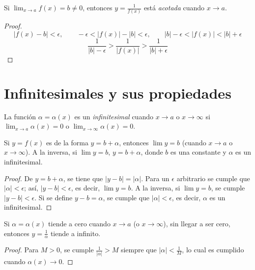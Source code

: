 \begin{theorem} \label{sec:acotado:teo:1}
  Si $\lim_{x \to a} f(x) = b \ne 0$, entonces $y = \frac{1}{f(x)}$ está \emph{acotada} cuando $x \to a$.
\end{theorem}

\begin{proof}
  $$|f(x) - b| < \epsilon, \qquad -\epsilon < |f(x)| - |b| < \epsilon,
  \qquad |b| -\epsilon < |f(x)| < |b| + \epsilon$$
  $$\frac{1}{|b| -\epsilon} > \frac{1}{|f(x)|} > \frac{1}{|b| + \epsilon}$$
\end{proof}




\section{Infinitesimales y sus propiedades}

\begin{definition}
  La función $\alpha = \alpha(x)$ es un \emph{infinitesimal} cuando $x \to a$ o $x \to \infty$ si $\lim_{x \to a} \alpha(x) = 0$ o $\lim_{x \to \infty} \alpha(x) = 0$.
\end{definition}


\begin{theorem} \label{sec:inf:teo:suminf}
  Si $y = f(x)$ es de la forma $y = b + \alpha$, entonces $\lim y = b$ (cuando $x \to a$ o $x \to \infty$). A la inversa, si $\lim y = b$, $y = b + \alpha$, donde $b$ es una constante y $\alpha$ es un infinitesimal.
\end{theorem}

\begin{proof}
  De $y = b + \alpha$, se tiene que $|y - b| = |\alpha|$. Para un $\epsilon$ arbitrario se cumple que $|\alpha| < \epsilon$; así, $|y - b| < \epsilon$, es decir, $\lim y = b$.
  A la inversa, si $\lim y = b$, se cumple $|y - b| < \epsilon$. Si se define $y - b = \alpha$, se cumple que $|\alpha| < \epsilon$, es decir, $\alpha$ es un infinitesimal.
\end{proof}


\begin{theorem} \label{sec:inf:teo:invinf}
  Si $\alpha = \alpha(x)$ tiende a cero cuando $x \to a$ (o $x \to \infty$), sin llegar a ser cero, entonces $y = \frac{1}{\alpha}$ tiende a infinito.
\end{theorem}

\begin{proof}
  Para $M > 0$, se cumple $\frac{1}{|\alpha|} > M$ siempre que $|\alpha| < \frac{1}{M}$, lo cual es cumplido cuando $\alpha(x) \to 0$.
\end{proof}


